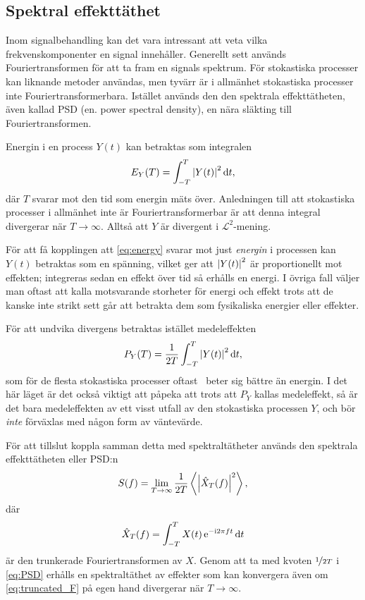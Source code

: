 \subsection{Spektral effekttäthet}

Inom signalbehandling kan det vara intressant att veta vilka frekvenskomponenter en signal innehåller. Generellt sett används Fouriertransformen för att ta fram en signals spektrum.
För stokastiska processer kan liknande metoder användas, men tyvärr är i allmänhet stokastiska processer inte Fouriertransformerbara. Istället används den den spektrala effekttätheten, även kallad PSD (en. power spectral density), en nära släkting till Fouriertransformen.

Energin i en process $Y(t)$ kan betraktas som integralen
\begin{equation}\label{eq:energy}
E_Y(T) = \int_{-T}^{T} \abs{Y(t)}^2\,\mathrm{d}{t},
\end{equation}
där $T$ svarar mot den tid som energin mäts över. Anledningen till att stokastiska processer i allmänhet inte är Fouriertransformerbar är att denna integral divergerar när $T\to\infty$. Alltså att $Y$ är divergent i $\mathcal{L}^2$-mening. 

För att få kopplingen att \eqref{eq:energy} svarar mot just \emph{energin} i processen kan $Y(t)$ betraktas som en spänning, vilket ger att $\abs{Y(t)}^2$ är proportionellt mot effekten; integreras sedan en effekt över tid så erhålls en energi. I övriga fall väljer man oftast att kalla motsvarande storheter för energi och effekt trots att de kanske inte strikt sett går att betrakta dem som fysikaliska energier eller effekter. 

För att undvika divergens betraktas istället medeleffekten 
\begin{equation}\label{eq:power}
P_Y(T) = \frac{1}{2T} \int_{-T}^{T} \abs{Y(t)}^2\,\mathrm{d}{t},
\end{equation}
som för de flesta stokastiska processer oftast~\cite{Miller_probability2012} beter sig bättre än energin.
I det här läget är det också viktigt att påpeka att trots att $P_Y$ kallas medeleffekt, så är det bara medeleffekten av ett visst utfall av den stokastiska processen $Y$, och bör \emph{inte} förväxlas med någon form av väntevärde. 

För att tillslut koppla samman detta med spektraltätheter används den spektrala effekttätheten eller PSD:n
\begin{equation}\label{eq:PSD}
S(f) =  \lim_{T\to\infty}\dfrac{1}{2T} \ev{\abs{\hat{X}_T(f)}^2},
\end{equation} 
där
\begin{equation}\label{eq:truncated_F}
\hat{X}_T(f) = \int_{-T}^{T} X(t)\,\mathrm{e}^{-\mathrm{i} 2\pi f t} \,\mathrm{d}{t}
\end{equation}
är den trunkerade Fouriertransformen av $X$. Genom att ta med kvoten $\nicefrac{1}{2T}$ i \eqref{eq:PSD} erhålls en spektraltäthet av effekter som kan konvergera även om \eqref{eq:truncated_F} på egen hand divergerar när $T\to\infty$. 

